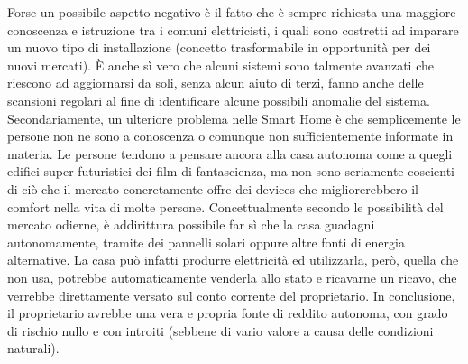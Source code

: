 Forse un possibile aspetto negativo è il fatto che è sempre richiesta una maggiore conoscenza e istruzione tra i comuni elettricisti, i quali sono costretti ad imparare un nuovo tipo di installazione (concetto trasformabile in opportunità per dei nuovi mercati). È anche sì vero che alcuni sistemi sono talmente avanzati che riescono ad aggiornarsi da soli, senza alcun aiuto di terzi, fanno anche delle scansioni regolari al fine di identificare alcune possibili anomalie del sistema. Secondariamente, un ulteriore problema nelle Smart Home è che semplicemente le persone non ne sono a conoscenza o comunque non sufficientemente informate in materia. Le persone tendono a pensare ancora alla casa autonoma come a quegli edifici super futuristici dei film di fantascienza, ma non sono seriamente coscienti di ciò che il mercato concretamente offre dei devices che migliorerebbero il comfort nella vita di molte persone.
Concettualmente secondo le possibilità del mercato odierne, è addirittura possibile far sì che la casa guadagni autonomamente, tramite dei pannelli solari oppure altre fonti di energia alternative. 
La casa può infatti produrre elettricità ed utilizzarla, però, quella che non usa, potrebbe automaticamente venderla allo stato e ricavarne un ricavo, che verrebbe direttamente versato sul conto corrente del proprietario. In conclusione, il proprietario avrebbe una vera e propria fonte di reddito autonoma, con grado di rischio nullo e con introiti (sebbene di vario valore a causa delle condizioni naturali).
